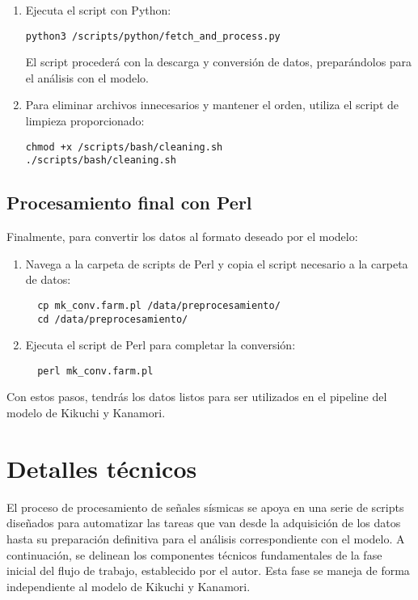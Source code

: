 \documentclass[a4paper,11pt]{refart}
\begin{document}
\begin{enumerate}
\item Ejecuta el script con Python:
\begin{verbatim}
python3 /scripts/python/fetch_and_process.py
\end{verbatim}
El script procederá con la descarga y conversión de datos, preparándolos para el análisis con el modelo.
\item Para eliminar archivos innecesarios y mantener el orden, utiliza el script de limpieza proporcionado:
\begin{verbatim}
chmod +x /scripts/bash/cleaning.sh
./scripts/bash/cleaning.sh
\end{verbatim}

\end{enumerate}

\subsection{Procesamiento final con Perl}

Finalmente, para convertir los datos al formato deseado por el modelo:
  \begin{enumerate}
  \item Navega a la carpeta de scripts de Perl y copia el script necesario a la carpeta de datos:
  \begin{verbatim}
  cp mk_conv.farm.pl /data/preprocesamiento/
  cd /data/preprocesamiento/
  \end{verbatim}
  \item Ejecuta el script de Perl para completar la conversión:
  \begin{verbatim}
  perl mk_conv.farm.pl
  \end{verbatim}
\end{enumerate}
Con estos pasos, tendrás los datos listos para ser utilizados en el pipeline del modelo de Kikuchi y Kanamori.

\section{Detalles técnicos}

El proceso de procesamiento de señales sísmicas se apoya en una serie de scripts diseñados para automatizar las tareas que van desde la adquisición de los datos hasta su preparación definitiva para el análisis correspondiente con el modelo. A continuación, se delinean los componentes técnicos fundamentales de la fase inicial del flujo de trabajo, establecido por el autor. Esta fase se maneja de forma independiente al modelo de Kikuchi y Kanamori.
\end{document}
